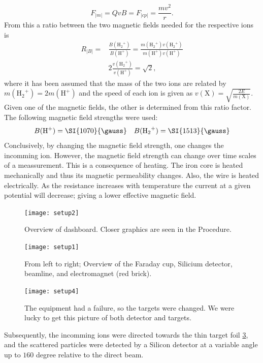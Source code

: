 \begin{equation}
F_|m| = QvB = F_|cp| = \frac{mv^2}{r}.
\end{equation}
From this a ratio between the two magnetic fields needed for the respective
ions is
\begin{align}
    R_|B| = & \frac{B({\mathrm{H_2}^+})}{B(\mathrm{H^+})} =
    \frac{m({\mathrm{H_2}^+})
    v({\mathrm{H_2}^+})}{m(\mathrm{H^+})v(\mathrm{H^+})}\\
    & 2 \frac{v({\mathrm{H_2}^+})}{v(\mathrm{H^+})} = \sqrt{2},
\end{align}
%
where it has been assumed that the mass of the two ions are related by
$m(\mathrm{{H_2}^+}) = 2m(\mathrm{H^+}) $ and the speed of each ion is given as
$v(\mathrm{X}) = \sqrt{\frac{2E}{m(\mathrm{X})}}$.
%
Given one of the magnetic fields, the other is determined from this ratio
factor. The following magnetic field strengths were used:
%
\begin{equation}
    B(\mathrm{H^+}) = \SI{1070}{\gauss} \quad B(\mathrm{{H_2}^+}) = \SI{1513}{\gauss}
\end{equation}
%
Conclusively, by changing the magnetic field strength, one changes the
incomming ion. However, the magnetic field strength can change over time scales
of a meassurement. This is a consequence of heating. The iron core is heated
mechanically and thus its magnetic permeability changes. Also, the wire is
heated electrically. As the resistance increases with temperature the
current at a given potential will decrease; giving a lower effective magnetic
field.

%
\begin{figure}[t]
    \centering
    \texttt{[image: setup2]}
    \caption{Overview of dashboard. Closer graphics are seen in the Procedure.}
    \label{fig_setup2}
\end{figure}
%
\begin{figure}[t]
    \centering
    \texttt{[image: setup1]}
    \caption{From left to right; Overview of the Faraday cup, Silicium detector, beamline, and electromagnet (red brick).}
    \label{fig_setup1}
\end{figure}
%
\begin{figure}[t]
    \centering
    \texttt{[image: setup4]}
    \caption{The equipment had a failure, so the targets were changed. We were
    lucky to get this picture of both detector and targets.}
    \label{fig_setup4}
\end{figure}
%
Subsequently, the incomming ions were directed towards the thin target foil
\cref{fig_setup4}, and the scattered particles were detected by a Silicon
detector at a variable angle up to $160$ degree relative to the
direct beam. 

